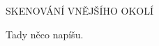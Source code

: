 \begin{lefttextpipe}
	{\Large \MakeUppercase{} SKENOVÁNÍ VNĚJŠÍHO OKOLÍ}
\end{lefttextpipe}

Tady něco napíšu.